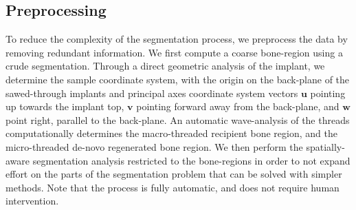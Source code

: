 \subsection{Preprocessing}\label{sec:preprocess}
To reduce the complexity of the segmentation process, we preprocess
the data by removing redundant information.
We first compute a coarse bone-region using a crude segmentation. Through a
direct geometric analysis of the implant, we determine the sample coordinate
system, with the origin on the back-plane of the sawed-through implants and
principal axes coordinate system vectors $\mathbf{u}$ pointing up towards the
implant top, $\mathbf{v}$ pointing forward away from the back-plane, and
$\mathbf{w}$ point right, parallel to the back-plane. An automatic
wave-analysis of the threads computationally determines the macro-threaded
recipient bone region, and the micro-threaded de-novo regenerated bone region.
We then perform the spatially-aware segmentation analysis restricted to the
bone-regions in order to not expand effort on the parts of the segmentation
problem that can be solved with simpler methods. Note that the process is fully
automatic, and does not require human intervention.



